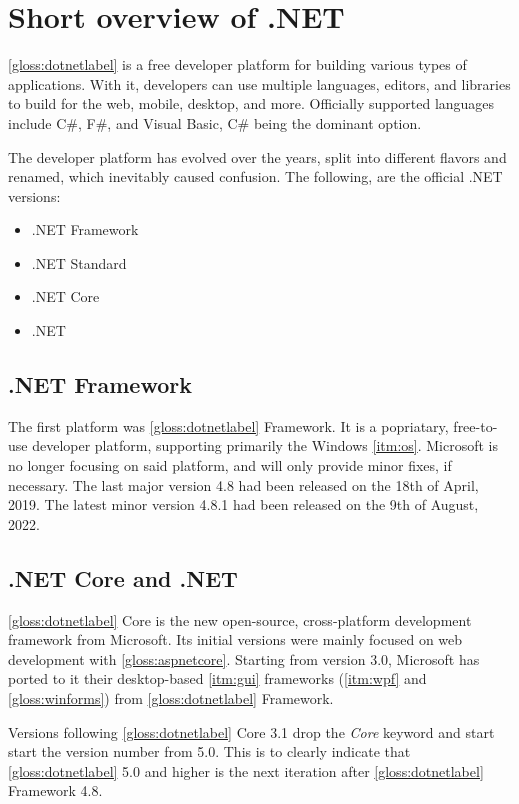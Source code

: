 \chapter{Short overview of .NET} \label{chap:overviewNET}
\ref{gloss:dotnetlabel} is a free developer platform for building various types of applications. With it, developers can use multiple languages, editors, and libraries to build for the web, mobile, desktop, and more.
Officially supported languages include C\#, F\#, and Visual Basic, C\# being the dominant option.

The developer platform has evolved over the years, split into different flavors and renamed, which inevitably caused confusion.
The following, are the official .NET versions:
\begin{itemize}
    \item .NET Framework
    \item .NET Standard
    \item .NET Core
    \item .NET
\end{itemize}

\section{.NET Framework}

The first platform was \ref{gloss:dotnetlabel} Framework. It is a popriatary, free-to-use developer platform, supporting primarily the Windows \ref{itm:os}. Microsoft is no longer focusing on said platform, and will only provide minor fixes, if necessary. The last major version 4.8 had been released on the 18th of April, 2019. The latest minor version 4.8.1 had been released on the 9th of August, 2022.

\section{.NET Core and .NET}

\ref{gloss:dotnetlabel} Core is the new open-source, cross-platform development framework from Microsoft. Its initial versions were mainly focused on web development with \ref{gloss:aspnetcore}. Starting from version 3.0, Microsoft has ported to it their desktop-based \ref{itm:gui} frameworks (\ref{itm:wpf} and \ref{gloss:winforms}) from \ref{gloss:dotnetlabel} Framework.

Versions following \ref{gloss:dotnetlabel} Core 3.1 drop the \textit{Core} keyword and start start the version number from 5.0. This is to clearly indicate that \ref{gloss:dotnetlabel} 5.0 and higher is the next iteration after \ref{gloss:dotnetlabel} Framework 4.8.


